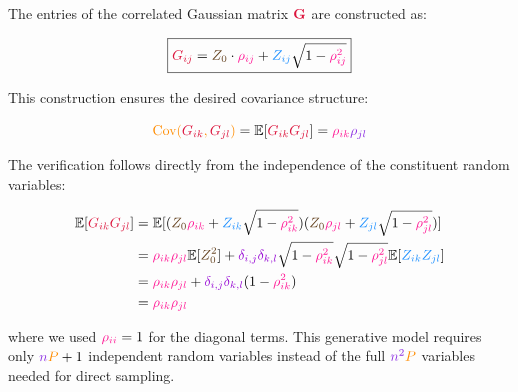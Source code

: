 \documentclass[a4paper]{article}
\theoremstyle{plain}
\theoremstyle{definition}
\theoremstyle{remark}
\begin{document}
The entries of the correlated Gaussian matrix $\textcolor{kernelcolor}{\mathbf{G}}$ are constructed as:

\begin{equation}
\boxed{\textcolor{kernelcolor}{G_{ij}} = \textcolor{weightcolor}{Z_0} \cdot \textcolor{breakthroughcolor}{\rho_{ij}} + \textcolor{sobolevcolor}{Z_{ij}} \sqrt{1 - \textcolor{breakthroughcolor}{\rho_{ij}^2}}} \label{eq:generative_construction}
\end{equation}

This construction ensures the desired \textcolor{resultcolor}{covariance structure}:

\begin{equation}
\textcolor{insightcolor}{\text{Cov}(\textcolor{kernelcolor}{G_{ik}}, \textcolor{kernelcolor}{G_{jl}})} = \mathbb{E}[\textcolor{kernelcolor}{G_{ik}} \textcolor{kernelcolor}{G_{jl}}] = \textcolor{breakthroughcolor}{\rho_{ik}} \textcolor{methodcolor}{\rho_{jl}} \label{eq:separable_covariance}
\end{equation}

The verification follows directly from the independence of the constituent random variables:

\begin{align}
\mathbb{E}[\textcolor{kernelcolor}{G_{ik}} \textcolor{kernelcolor}{G_{jl}}] &= \mathbb{E}[(\textcolor{weightcolor}{Z_0} \textcolor{breakthroughcolor}{\rho_{ik}} + \textcolor{sobolevcolor}{Z_{ik}}\sqrt{1-\textcolor{breakthroughcolor}{\rho_{ik}^2}})(\textcolor{weightcolor}{Z_0} \textcolor{breakthroughcolor}{\rho_{jl}} + \textcolor{sobolevcolor}{Z_{jl}}\sqrt{1-\textcolor{breakthroughcolor}{\rho_{jl}^2}})] \\
&= \textcolor{breakthroughcolor}{\rho_{ik}} \textcolor{breakthroughcolor}{\rho_{jl}} \mathbb{E}[\textcolor{weightcolor}{Z_0^2}] + \textcolor{k3color}{\delta_{i,j}\delta_{k,l}}\sqrt{1-\textcolor{breakthroughcolor}{\rho_{ik}^2}}\sqrt{1-\textcolor{breakthroughcolor}{\rho_{jl}^2}}\mathbb{E}[\textcolor{sobolevcolor}{Z_{ik}}\textcolor{sobolevcolor}{Z_{jl}}] \\
&= \textcolor{breakthroughcolor}{\rho_{ik}} \textcolor{breakthroughcolor}{\rho_{jl}} + \textcolor{k3color}{\delta_{i,j}\delta_{k,l}}(1-\textcolor{breakthroughcolor}{\rho_{ik}^2}) \\
&= \textcolor{breakthroughcolor}{\rho_{ik}} \textcolor{breakthroughcolor}{\rho_{jl}} \label{eq:covariance_verification}
\end{align}

where we used $\textcolor{breakthroughcolor}{\rho_{ii}} = 1$ for the diagonal terms. This generative model requires only $\textcolor{methodcolor}{n}\textcolor{insightcolor}{P} + 1$ independent random variables instead of the full $\textcolor{methodcolor}{n^2}\textcolor{insightcolor}{P}$ variables needed for direct sampling.
\end{document}
